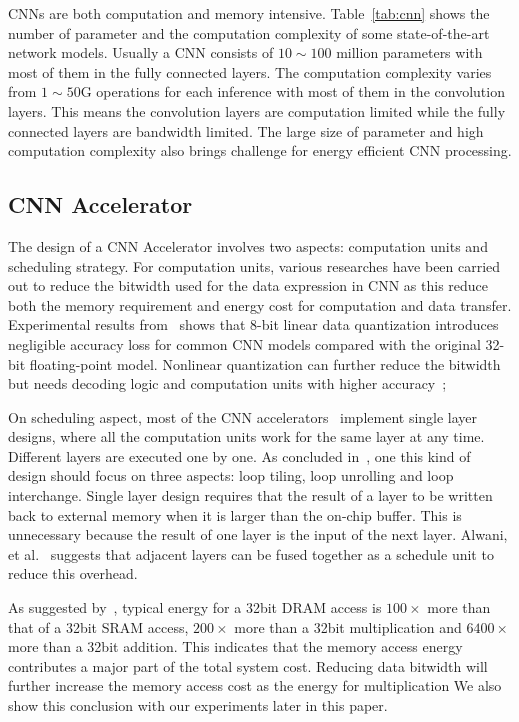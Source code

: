 \documentclass[10pt, conference]{IEEEtran}
\begin{document}
    CNNs are both computation and memory intensive. Table~\ref{tab:cnn} shows the number of parameter and the computation complexity of some state-of-the-art network models. Usually a CNN consists of $10\sim 100$ million parameters with most of them in the fully connected layers. The computation complexity varies from $1\sim 50$G operations for each inference with most of them in the convolution layers. This means the convolution layers are computation limited while the fully connected layers are bandwidth limited. The large size of parameter and high computation complexity also brings challenge for energy efficient CNN processing.
    
    
    
    \subsection{CNN Accelerator}
    The design of a CNN Accelerator involves two aspects: computation units and scheduling strategy. For computation units, various researches have been carried out to reduce the bitwidth used for the data expression in CNN as this reduce both the memory requirement and energy cost for computation and data transfer. Experimental results from~\cite{guo2017software} shows that 8-bit linear data quantization introduces negligible accuracy loss for common CNN models compared with the original 32-bit floating-point model. Nonlinear quantization can further reduce the bitwidth~\cite{han2015deep} but needs decoding logic and computation units with higher accuracy~\cite{eie};
    
    On scheduling aspect, most of the CNN accelerators~\cite{zhang2015optimizing}\cite{qiu2016going}\cite{ma2017optimizing} implement single layer designs, where all the computation units work for the same layer at any time. Different layers are executed one by one. As concluded in~\cite{ma2017optimizing}, one this kind of design should focus on three aspects: loop tiling, loop unrolling and loop interchange. Single layer design requires that the result of a layer to be written back to external memory when it is larger than the on-chip buffer. This is unnecessary because the result of one layer is the input of the next layer. Alwani, et al.~\cite{alwani2016fused} suggests that adjacent layers can be fused together as a schedule unit to reduce this overhead.
    
    As suggested by~\cite{mac_energy}, typical energy for a 32bit DRAM access is $100\times$ more than that of a 32bit SRAM access, $200\times$ more than a 32bit multiplication and $6400\times$ more than a 32bit addition. This indicates that the memory access energy contributes a major part of the total system cost. Reducing data bitwidth will further increase the memory access cost as the energy for multiplication We also show this conclusion with our experiments later in this paper.
    
\end{document}
